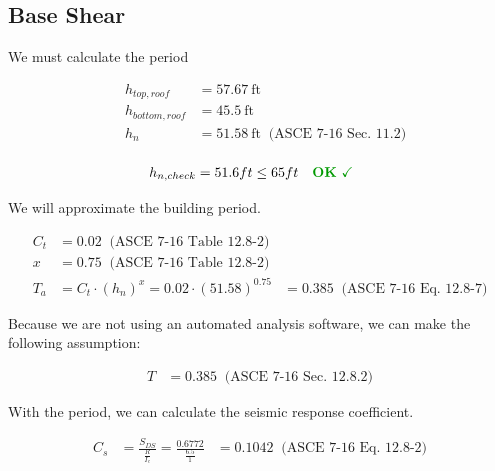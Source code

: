\documentclass[11pt]{article}
\begin{document}
    
    \subsection{Base Shear}\label{base-shear}

We must calculate the period

    \begin{equation*}
\begin{aligned}
&h_{top,roof} &= 57.67\ \mathrm{ft} \; 
\\
 &h_{bottom,roof} &= 45.5\ \mathrm{ft} \; 
\\
 &h_{n} &= 51.58\ \mathrm{ft} \; \;\textrm{(ASCE 7-16 Sec. 11.2)}
\\
\end{aligned}
\end{equation*}

    
    \begin{equation*}
\begin{aligned}
h_{n,check} &= 51.6 ft \leq 65 ft \quad \textbf{\color{OK}OK}\ {\color{OK}\checkmark} \; 
\end{aligned}
\end{equation*}

    
    We will approximate the building period.

    \begin{equation*}
\begin{aligned}
C_{t} &= 0.02 \; \;\textrm{(ASCE 7-16 Table 12.8-2)}
\\
x &= 0.75 \; \;\textrm{(ASCE 7-16 Table 12.8-2)}
\\
T_{a} &= C_{t} \cdot \left( h_{n} \right) ^{ x }  = 0.02 \cdot \left( 51.58 \right) ^{ 0.75 } &= 0.385 \; \;\textrm{(ASCE 7-16 Eq. 12.8-7)}
\end{aligned}
\end{equation*}

    
    Because we are not using an automated analysis software, we can make the
following assumption:

    \begin{equation*}
\begin{aligned}
T &= 0.385 \; \;\textrm{(ASCE 7-16 Sec. 12.8.2)}
\end{aligned}
\end{equation*}

    
    With the period, we can calculate the seismic response coefficient.

    \begin{equation*}
\begin{aligned}
C_{s} &= \frac{ S_{DS} }{ \frac{ R }{ I_{e} } }  = \frac{ 0.6772 }{ \frac{ 6.5 }{ 1 } } &= 0.1042 \; \;\textrm{(ASCE 7-16 Eq. 12.8-2)}
\end{aligned}
\end{equation*}
\end{document}
